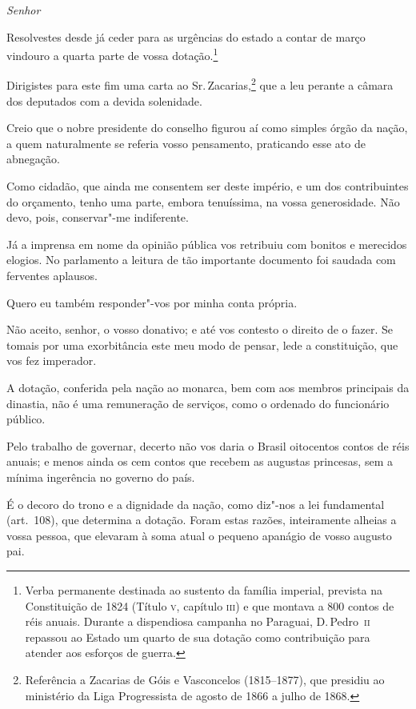 \begin{linenumbers}

\noindent\textit{Senhor}\smallskip

 Resolvestes desde já ceder para as urgências do estado a contar de
março vindouro a quarta parte de vossa
dotação.\footnote{ Verba permanente destinada ao sustento da família imperial, prevista na
Constituição de 1824 (Título \textsc{v}, capítulo \textsc{iii}) e que montava a 800
contos de réis anuais. Durante a dispendiosa campanha no Paraguai, D.\,Pedro~\textsc{ii} 
repassou ao Estado um quarto de sua dotação como contribuição para atender aos esforços de guerra.}


 Dirigistes para este fim uma carta ao Sr.\,Zacarias,\footnote{ Referência a 
Zacarias de Góis e Vasconcelos (1815--1877), que presidiu
ao ministério da Liga Progressista de agosto de 1866 a julho de 1868.}
 que a leu perante a câmara dos deputados com a devida solenidade.

 Creio que o nobre presidente do conselho figurou aí como simples órgão
da nação, a quem naturalmente se referia vosso pensamento, praticando
esse ato de abnegação. 

 Como cidadão, que ainda me consentem ser deste império, e um dos
contribuintes do orçamento, tenho uma parte, embora tenuíssima, na
vossa generosidade. Não devo, pois, conservar"-me indiferente. 

 Já a imprensa em nome da opinião pública vos retribuiu com bonitos e
merecidos elogios. No parlamento a leitura de tão importante documento
foi saudada com ferventes aplausos. 

 Quero eu também responder"-vos por minha conta própria.

 Não aceito, senhor, o vosso donativo; e até vos contesto o direito de o
fazer. Se tomais por uma exorbitância este meu modo de pensar, lede a
constituição, que vos fez imperador. 

 A dotação, conferida pela nação ao monarca, bem com aos membros
principais da dinastia, não é uma remuneração de serviços, como o
ordenado do funcionário público.

 Pelo trabalho de governar, decerto não vos daria o Brasil oitocentos
contos de réis anuais; e menos ainda os cem contos que recebem as
augustas princesas, sem a mínima ingerência no governo do país. 

 É o decoro do trono e a dignidade da nação, como diz"-nos a lei
fundamental (art.~108), que determina a dotação. Foram estas razões,
inteiramente alheias a vossa pessoa, que elevaram à soma atual o
pequeno apanágio de vosso augusto pai. 


\end{linenumbers}

